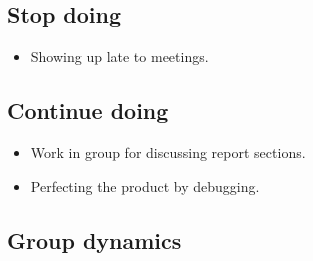 \subsection{Stop doing}
\label{subsec:S5RetrospectiveStop}
\begin{itemize}
\item Showing up late to meetings. 
\end{itemize}

\subsection{Continue doing}
\label{subsec:S5RetrospectiveContinue}

\begin{itemize}
  \item Work in group for discussing report sections.
  \item Perfecting the product by debugging. 
\end{itemize}

\subsection{Group dynamics}
\label{subsec:S5RetrospectiveDynamics}



